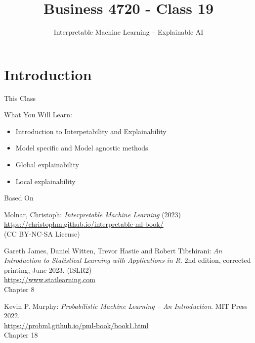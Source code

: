 \documentclass[ignorenonframetext,xcolor=x11names]{beamer}
\title{Business 4720 - Class 19}
\subtitle{Interpretable Machine Learning -- Explainable AI}
\begin{document}
\begin{frame}[label=full]{}
  \titlepage
  \footnotesize
  
\end{frame}

\section{Introduction}

\begin{frame}[label=full]{This Class}

\begin{block}{What You Will Learn:}
\begin{itemize}
  \item Introduction to Interpetability and Explainability
  \item Model specific and Model agnostic methods
  \item Global explainability
  \item Local explainability
\end{itemize}
\end{block}
\end{frame}

\begin{frame}[label=full]{Based On}

\begin{block}{}
Molnar, Christoph: \emph{Interpretable Machine Learning} (2023) \\
\vspace{1mm}
\small
\url{https://christophm.github.io/interpretable-ml-book/} \\
\normalsize
\vspace{1mm}
(CC BY-NC-SA License)
\end{block}

\begin{block}{}
Gareth James, Daniel Witten, Trevor Hastie and Robert Tibshirani: \emph{An Introduction to Statistical Learning with Applications in R}. 2nd edition, corrected printing, June 2023. (ISLR2) \\
\vspace{1mm}
\small
\url{https://www.statlearning.com} \\
\normalsize
\vspace{1mm}
Chapter 8
\end{block}

\begin{block}{}
Kevin P. Murphy: \emph{Probabilistic Machine Learning -- An Introduction}. MIT Press 2022. \\
\vspace{1mm}
\small
\url{https://probml.github.io/pml-book/book1.html} \\
\normalsize
\vspace{1mm}
Chapter 18
\end{block}
\end{frame}
\end{document}
